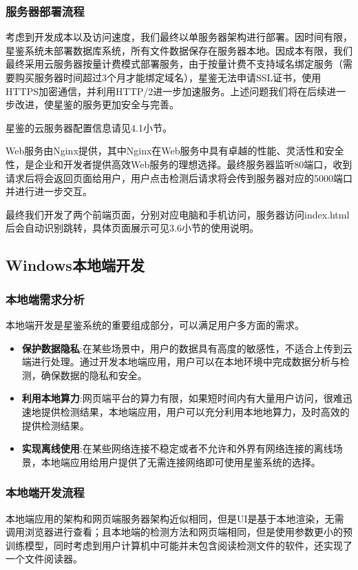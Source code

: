 \documentclass[a4paper]{report}
\begin{document}
\subsubsection{服务器部署流程}
考虑到开发成本以及访问速度，我们最终以单服务器架构进行部署。因时间有限，星鉴系统未部署数据库系统，所有文件数据保存在服务器本地。因成本有限，我们最终采用云服务器按量计费模式部署服务，由于按量计费不支持域名绑定服务（需要购买服务器时间超过3个月才能绑定域名），星鉴无法申请SSL证书，使用HTTPS加密通信，并利用HTTP/2进一步加速服务。上述问题我们将在后续进一步改进，使星鉴的服务更加安全与完善。

星鉴的云服务器配置信息请见4.1小节。

Web服务由Nginx提供，其中Nginx在Web服务中具有卓越的性能、灵活性和安全性，是企业和开发者提供高效Web服务的理想选择。最终服务器监听80端口，收到请求后将会返回页面给用户，用户点击检测后请求将会传到服务器对应的5000端口并进行进一步交互。

最终我们开发了两个前端页面，分别对应电脑和手机访问，服务器访问index.html后会自动识别跳转，具体页面展示可见3.6小节的使用说明。

\subsection{Windows本地端开发}
\subsubsection{本地端需求分析}
本地端开发是星鉴系统的重要组成部分，可以满足用户多方面的需求。
\begin{itemize}
	\item \textbf{保护数据隐私}:在某些场景中，用户的数据具有高度的敏感性，不适合上传到云端进行处理。通过开发本地端应用，用户可以在本地环境中完成数据分析与检测，确保数据的隐私和安全。
	\item \textbf{利用本地算力}:网页端平台的算力有限，如果短时间内有大量用户访问，很难迅速地提供检测结果，本地端应用，用户可以充分利用本地地算力，及时高效的提供检测结果。
	\item \textbf{实现离线使用}:在某些网络连接不稳定或者不允许和外界有网络连接的离线场景，本地端应用给用户提供了无需连接网络即可使用星鉴系统的选择。
\end{itemize}

\subsubsection{本地端开发流程}
本地端应用的架构和网页端服务器架构近似相同，但是UI是基于本地渲染，无需调用浏览器进行查看；且本地端的检测方法和网页端相同，但是使用参数更小的预训练模型，同时考虑到用户计算机中可能并未包含阅读检测文件的软件，还实现了一个文件阅读器。
\end{document}
